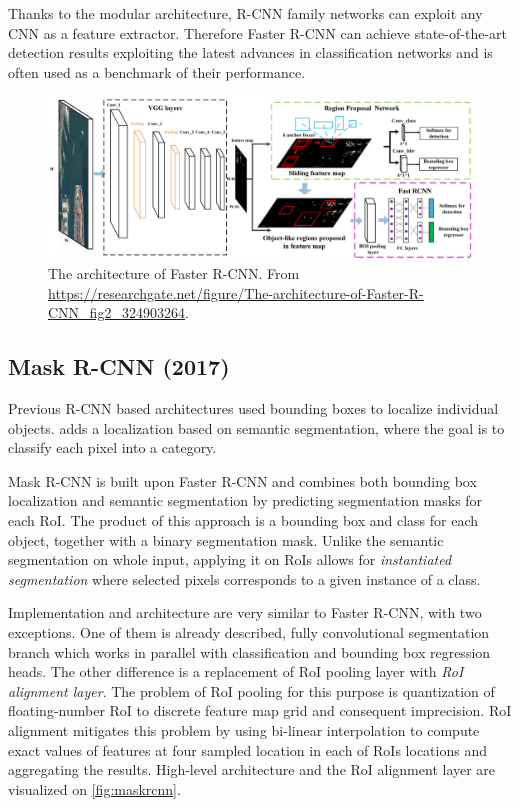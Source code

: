 \noindent Thanks to the modular architecture, R-CNN family networks can exploit any CNN as a feature extractor.  Therefore Faster R-CNN can achieve state-of-the-art detection results exploiting the latest advances in classification networks and is often used as a benchmark of their performance.
     

 \begin{figure}
     \centering
     \includegraphics[width=\textwidth]{img/fasterrcnn}
     \caption[Faster R-CNN architecture]%
     {The architecture of Faster R-CNN. From \url{https://researchgate.net/figure/The-architecture-of-Faster-R-CNN\_fig2\_324903264}.}
     \label{fig:fasterrcnn}
 \end{figure}

 \subsection{Mask R-CNN (2017)}
Previous R-CNN based architectures used bounding boxes to localize individual objects. \citeauthor{bib:maskrcnn} \cite{bib:maskrcnn} adds a localization based on semantic segmentation, where the goal is to classify each pixel into a category. 

Mask R-CNN is built upon Faster R-CNN and combines both bounding box localization and semantic segmentation by predicting segmentation masks for each RoI. The product of this approach is a bounding box and class for each object, together with a binary segmentation mask. Unlike the semantic segmentation on whole input, applying it on RoIs allows for \textit{instantiated segmentation} where selected pixels corresponds to a given instance of a class.

Implementation and architecture are very similar to Faster R-CNN, with two exceptions. One of them is already described, fully convolutional segmentation branch which works in parallel with classification and bounding box regression heads. The other difference is a replacement of RoI pooling layer with \textit{RoI alignment layer}. The problem of RoI pooling for this purpose is quantization of floating-number RoI to discrete feature map grid and consequent imprecision. RoI alignment mitigates this problem by using bi-linear interpolation to compute exact values of features at four sampled location in each of RoIs locations and aggregating the results. High-level architecture and the RoI alignment layer are visualized on \cref{fig:maskrcnn}.

